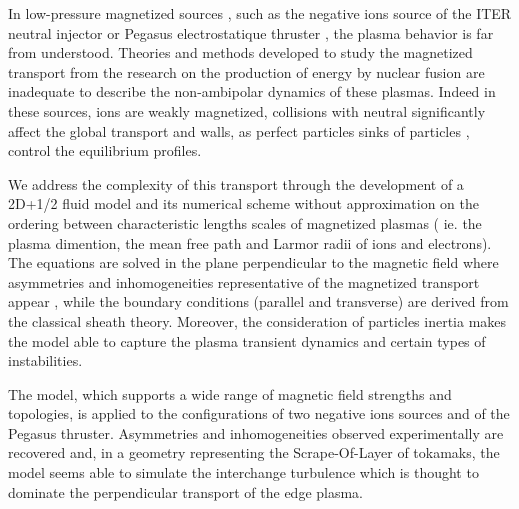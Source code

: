 In low-pressure magnetized sources , such as the negative ions source of the
ITER neutral injector or Pegasus electrostatique thruster , the plasma behavior
is far from understood. Theories and methods developed to study the magnetized
transport from the research on the production of energy by nuclear fusion are
inadequate to describe the non-ambipolar dynamics of these plasmas.
Indeed in these sources, ions are weakly magnetized, collisions with neutral
significantly affect the global transport and walls, as perfect particles sinks
of particles , control the equilibrium profiles.

We address the complexity of this transport through the development of a 2D+1/2
fluid model and its numerical scheme without approximation on the ordering
between characteristic lengths scales of magnetized plasmas ( ie. the plasma
dimention, the mean free path and Larmor radii of ions and electrons).
The equations are solved in the plane perpendicular to the magnetic field where
asymmetries and inhomogeneities representative of the magnetized transport
appear , while the boundary conditions (parallel and transverse) are derived
from the classical sheath theory. Moreover, the consideration of particles
inertia makes the model able to capture the plasma transient dynamics and
certain types of instabilities.
	
The model, which supports a wide range of magnetic field strengths and
topologies, is applied to the configurations of two negative ions sources and of
the Pegasus thruster. Asymmetries and inhomogeneities observed experimentally
are recovered and, in a geometry representing the Scrape-Of-Layer of tokamaks,
the model seems able to simulate the interchange turbulence which is thought to
dominate the perpendicular transport of the edge plasma.
		  
		
